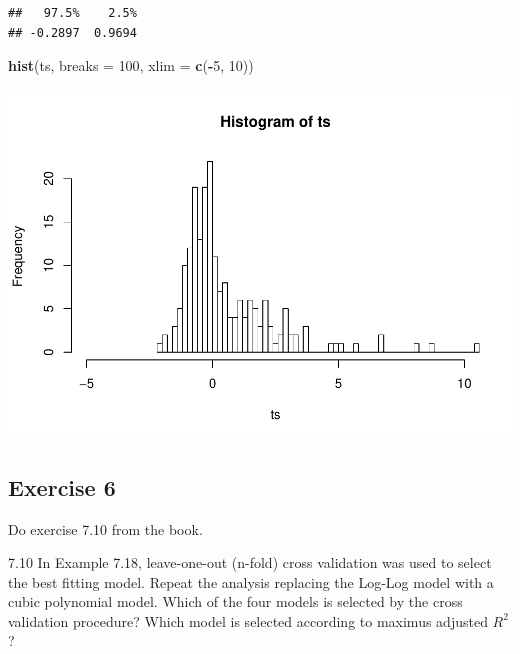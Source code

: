 \documentclass[
]{article}
\newenvironment{Shaded}{\begin{snugshade}}{\end{snugshade}}
\newcommand{\DataTypeTok}[1]{\textcolor[rgb]{0.13,0.29,0.53}{#1}}
\newcommand{\DecValTok}[1]{\textcolor[rgb]{0.00,0.00,0.81}{#1}}
\newcommand{\KeywordTok}[1]{\textcolor[rgb]{0.13,0.29,0.53}{\textbf{#1}}}
\newcommand{\NormalTok}[1]{#1}
\newcommand{\OperatorTok}[1]{\textcolor[rgb]{0.81,0.36,0.00}{\textbf{#1}}}
\begin{document}
\begin{verbatim}
##   97.5%    2.5% 
## -0.2897  0.9694
\end{verbatim}

\begin{Shaded}
\begin{Highlighting}[]
\KeywordTok{hist}\NormalTok{(ts, }\DataTypeTok{breaks =} \DecValTok{100}\NormalTok{, }\DataTypeTok{xlim =} \KeywordTok{c}\NormalTok{(}\OperatorTok{-}\DecValTok{5}\NormalTok{, }\DecValTok{10}\NormalTok{))}
\end{Highlighting}
\end{Shaded}

\includegraphics{428HW5-yutingd3_files/figure-latex/unnamed-chunk-15-1.pdf}

\hypertarget{exercise-6}{%
\subsection{Exercise 6}\label{exercise-6}}

Do exercise 7.10 from the book.

7.10 In Example 7.18, leave-one-out (n-fold) cross validation was used
to select the best fitting model. Repeat the analysis replacing the
Log-Log model with a cubic polynomial model. Which of the four models is
selected by the cross validation procedure? Which model is selected
according to maximus adjusted \(R^2\)?
\end{document}
